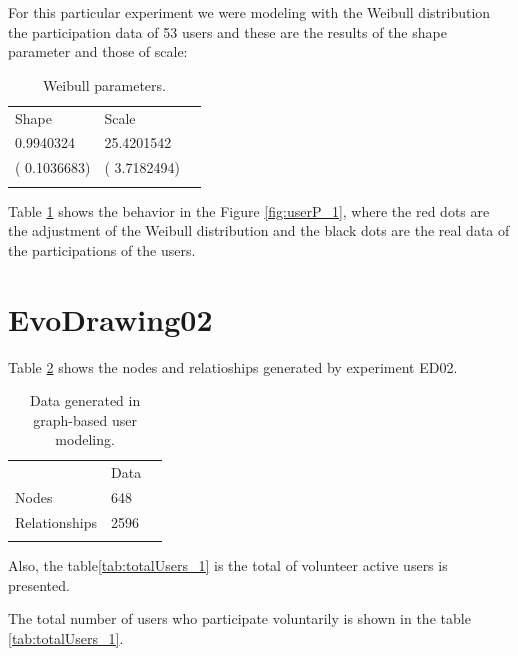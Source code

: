 For this particular experiment we were modeling with the Weibull distribution
\cite{weibull1951wide} the participation data of 53 users and these are the
results of the shape parameter and those of scale:

\begin{table}
\small
\caption{Weibull parameters.}
\label{tab:weibullp_1}
\centering
\small
\begin{tabular}{p{3cm} p{3cm} p{3cm} }
\hline\noalign{\smallskip}
Shape  & Scale &  \\
\noalign{\smallskip}\hline\noalign{\smallskip}
\small{0.9940324} & \small{25.4201542} & \\ \hline
\small{( 0.1036683)} & \small{( 3.7182494)} & \\ \hline

\noalign{\smallskip}\hline
\end{tabular}
\end{table}

Table \ref{tab:weibullp_1} shows the behavior in the Figure
\ref{fig:userP_1}, where the red dots are the adjustment of the Weibull
distribution and the black dots are the real data of the participations of the
users.



\section {EvoDrawing02}



Table \ref{tab:dataGenerated_2} shows the nodes and relatioships generated
by experiment ED02.

\begin{table}
\small
\caption{Data generated in graph-based user modeling.}
\label{tab:dataGenerated_2}
\centering
\small
\begin{tabular}{p{3cm} p{3cm} p{3cm} }
\hline\noalign{\smallskip}
  & Data &  \\
\noalign{\smallskip}\hline\noalign{\smallskip}
\small{Nodes} & \small{648} & \\ \hline
\small{Relationships} & \small{2596} & \\ \hline

\noalign{\smallskip}\hline
\end{tabular}
\end{table}
Also, the table\ref{tab:totalUsers_1} is the total of volunteer active users is
presented.

The total number of users who participate voluntarily is shown in the table \ref{tab:totalUsers_1}.

